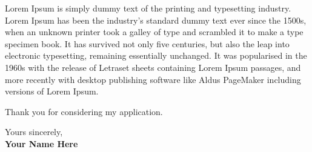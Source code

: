 \documentclass[a4paper,12pt]{article}
\begin{document}
\begin{titlepage}
\vspace{0.7em}


Lorem Ipsum is simply dummy text of the printing and typesetting industry. Lorem Ipsum has been the industry's standard dummy text ever since the 1500s, when an unknown printer took a galley of type and scrambled it to make a type specimen book. It has survived not only five centuries, but also the leap into electronic typesetting, remaining essentially unchanged. It was popularised in the 1960s with the release of Letraset sheets containing Lorem Ipsum passages, and more recently with desktop publishing software like Aldus PageMaker including versions of Lorem Ipsum.\vspace{0.7em}



\vspace{0.7em}

Thank you for considering my application.

\vspace{0.7em}

\raggedright Yours sincerely,\\
\vspace{0.7em}
\textbf{Your Name Here}

\end{titlepage}
\end{document}
